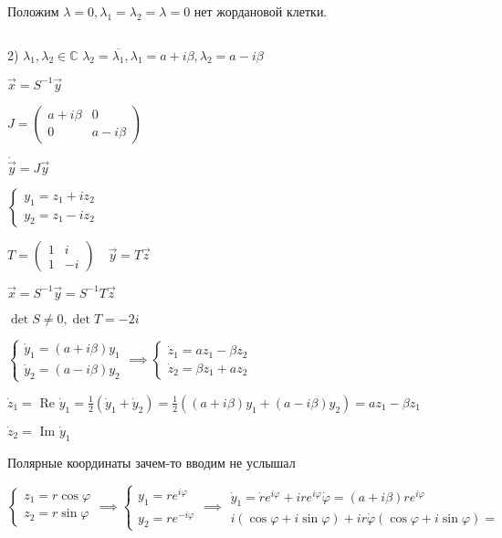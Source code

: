 \documentclass[12pt, a4paper]{article}
\begin{document}
    \par $ $

    Положим $\lambda = 0, \lambda_1 = \lambda_2 = \lambda = 0$ 
    нет жордановой клетки. 

    \par $ $

    2) $\lambda_1 , \lambda_2 \in \mathbb{C}$
    $\lambda_2 = \overline{\lambda_1}, \lambda_1 = a + i\beta, 
    \lambda_2 = a - i\beta$

    $\vec{x} = S^{-1}\vec{y}$

    $J = \begin{pmatrix}
        a+ i\beta & 0 \\ 0 & a - i\beta
    \end{pmatrix}
    $

    $\dot{\vec{y}} = J\vec{y}$

    $\begin{cases}
        y_1 = z_1 + iz_2 \\ y_2 = z_1 - iz_2
    \end{cases}$
    
        $T = \begin{pmatrix}
            1 & i \\ 1 & -i
        \end{pmatrix} \quad \vec{y} = T\vec{z}$

    $\vec{x} = S^{-1}\vec{y} = S^{-1}T\vec{z}$

    $\det S \neq 0, \det T = -2i$

    $\begin{cases}
        \dot y_1 = (a + i\beta)y_1 \\ \dot y_2 = (a - i\beta)y_2 
    \end{cases} \implies 
    \begin{cases}
        \dot z_1 = az_1 - \beta z_2 \\ \dot z_2 = \beta z_1 + az_2
    \end{cases}$

    $\dot z_1 = \text{ Re } \dot y_1 = \frac{1}{2}(\dot y_1 + \dot y_2) = 
    \frac{1}{2}((a + i\beta)y_1 + (a - i\beta)y_2) = 
    az_1 - \beta z_1$
    
    $\dot z_2 = \text{ Im } \dot y_1$

    Полярные координаты зачем-то вводим не услышал

    $\begin{cases}
        z_1 = r\cos\varphi \\ z_2 = r\sin\varphi
    \end{cases} \implies 
    \begin{cases}
        y_1 = re^{i\varphi}\\
        y_2 = re^{-i\varphi}
    \end{cases} \implies 
    \begin{matrix}
        \dot y_1 = \dot r e^{i\varphi} + ire^{i\varphi} \dot \varphi = (a + i\beta)re^{i\varphi}\\
        i(\cos\varphi + i \sin\varphi) + ir\dot \varphi (\cos\varphi + i\sin\varphi) = 
    \end{matrix}
    $
\end{document}
